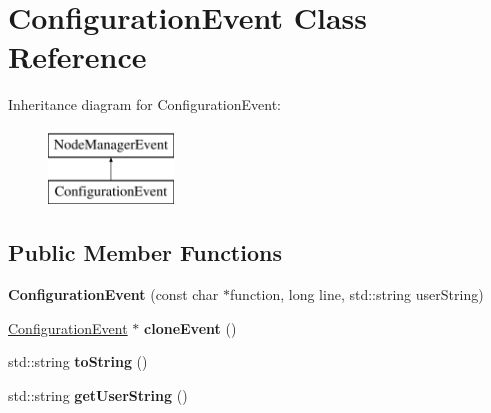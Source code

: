 \hypertarget{class_configuration_event}{\section{\-Configuration\-Event \-Class \-Reference}
\label{class_configuration_event}
}
\-Inheritance diagram for \-Configuration\-Event\-:\begin{figure}[H]
\begin{center}
\leavevmode
\includegraphics[height=2.000000cm]{class_configuration_event}
\end{center}
\end{figure}
\subsection*{\-Public \-Member \-Functions}
\begin{DoxyCompactItemize}
\item 
\hypertarget{class_configuration_event_a8990f36029c71b30bf79cd3994cb70ac}{{\bfseries \-Configuration\-Event} (const char $\ast$function, long line, std\-::string user\-String)}\label{class_configuration_event_a8990f36029c71b30bf79cd3994cb70ac}

\item 
\hypertarget{class_configuration_event_adef706620e68af24fcd4f8361a9de747}{\hyperlink{class_configuration_event}{\-Configuration\-Event} $\ast$ {\bfseries clone\-Event} ()}\label{class_configuration_event_adef706620e68af24fcd4f8361a9de747}

\item 
\hypertarget{class_configuration_event_a248f6a205ffc1f2702bd536a125701e8}{std\-::string {\bfseries to\-String} ()}\label{class_configuration_event_a248f6a205ffc1f2702bd536a125701e8}

\item 
\hypertarget{class_configuration_event_a35492b68f4def8b70ad88840cba75d71}{std\-::string {\bfseries get\-User\-String} ()}\label{class_configuration_event_a35492b68f4def8b70ad88840cba75d71}

\end{DoxyCompactItemize}
